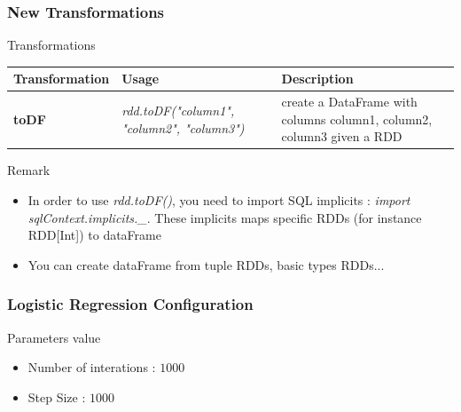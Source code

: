 \documentclass[slidetop,9pt,utf8]{beamer}
\begin{document}
\begin{frame}

  \frametitle{New Transformations}

  \begin{block}{Transformations}
    \begin{center}
      \begin{tabular}{|m{2.1cm}|m{3.5cm}|m{5cm}|}
        \hline 
        \rowcolor{gray} \textbf{Transformation} & \textbf{Usage} & \textbf{Description} \\ \hline
        \textbf{toDF} & \textit{rdd.toDF("column1", "column2", "column3")} & create a DataFrame with columns column1, column2, column3 given a RDD \\ \hline
      \end{tabular}
    \end{center}
  \end{block}

  \begin{block}{Remark}
    \begin{itemize}
      \item In order to use \textit{rdd.toDF()}, you need to import SQL implicits : \textit{import sqlContext.implicits.\_}. These implicits maps specific RDDs (for instance RDD[Int]) to dataFrame
      \item You can create dataFrame from tuple RDDs, basic types RDDs...
    \end{itemize}
  \end{block}

\end{frame}

\begin{frame}
  \frametitle{Logistic Regression Configuration}

  \begin{block}{Parameters value}
    \begin{itemize}
      \item Number of interations : $1000$
      \item Step Size : $1000$
    \end{itemize}
  \end{block}

\end{frame}
\end{document}

